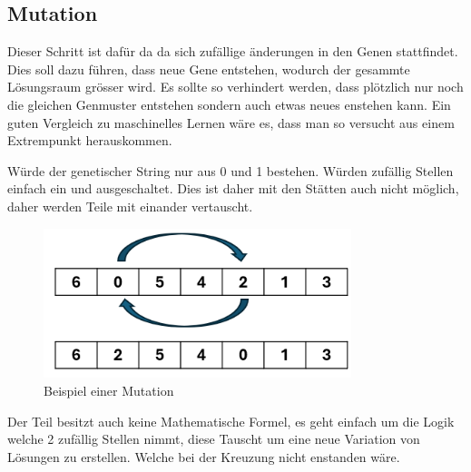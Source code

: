 %
%
%
%
\subsection{Mutation
\label{genetic_algorithm:mutation}}
Dieser Schritt ist dafür da da sich zufällige änderungen in den 
Genen stattfindet. Dies soll dazu führen, dass neue Gene entstehen, 
wodurch der gesammte Lösungsraum grösser wird. Es sollte so 
verhindert werden, dass plötzlich nur noch die gleichen 
Genmuster entstehen sondern auch etwas neues enstehen kann. 
Ein guten Vergleich zu maschinelles Lernen wäre es, dass man so 
versucht aus einem Extrempunkt herauskommen.

Würde der genetischer String nur aus 0 und 1 bestehen. Würden zufällig 
Stellen einfach ein und ausgeschaltet. Dies ist daher mit den Stätten 
auch nicht möglich, daher werden Teile mit einander vertauscht.

\begin{figure} [h]
	\centering
	\includegraphics[width=0.8\textwidth]{
        papers/variationsprinzip_algorithmen/images/teil3/09_genetic_string_cities_mutation.png
        }
	\caption{Beispiel einer Mutation}
	\label{fig:mutation_genetic_string}
\end{figure}

Der Teil besitzt auch keine Mathematische Formel, es geht einfach um die 
Logik welche 2 zufällig Stellen nimmt, diese Tauscht um eine neue 
Variation von Lösungen zu erstellen. Welche bei der Kreuzung nicht enstanden
wäre.
